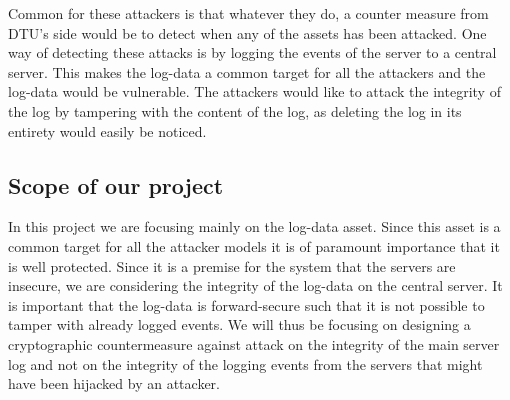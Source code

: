 Common for these attackers is that whatever they do, a counter measure
from DTU's side would be to detect when any of the assets has been
attacked. One way of detecting these attacks is by logging the events
of the server to a central server. This makes the log-data a common
target for all the attackers and the log-data would be vulnerable. The
attackers would like to attack the integrity of the log by tampering
with the content of the log, as deleting the log in its entirety would
easily be noticed.

\subsection{Scope of our project}
In this project we are focusing mainly on the log-data asset. Since
this asset is a common target for all the attacker models it is of
paramount importance that it is well protected. Since it is a premise
for the system that the servers are insecure, we are considering the
integrity of the log-data on the central server. It is important that
the log-data is forward-secure such that it is not possible to tamper
with already logged events. We will thus be focusing on designing a
cryptographic countermeasure against attack on the integrity of the
main server log and not on the integrity of the logging events from
the servers that might have been hijacked by an attacker.




